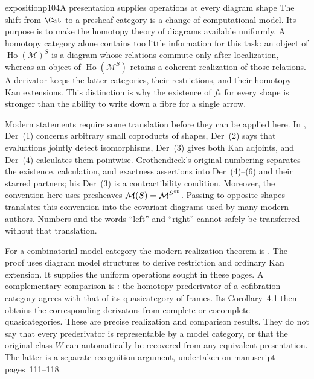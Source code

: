 \begin{dcomment}{exposition}{p104}{A presentation supplies operations at every diagram shape}
The shift from $\Cat$ to a presheaf category is a change of computational model. Its purpose is to make the homotopy theory of diagrams available uniformly. A homotopy category alone contains too little information for this task: an object of $\operatorname{Ho}(\mathcal M)^S$ is a diagram whose relations commute only after localization, whereas an object of $\operatorname{Ho}(\mathcal M^S)$ retains a coherent realization of those relations. A derivator keeps the latter categories, their restrictions, and their homotopy Kan extensions. This distinction is why the existence of $f_*$ for every shape is stronger than the ability to write down a fibre for a single arrow.

Modern statements require some translation before they can be applied here. In \citet[Definition~1.5]{Groth2013}, Der~(1) concerns arbitrary small coproducts of shapes, Der~(2) says that evaluations jointly detect isomorphisms, Der~(3) gives both Kan adjoints, and Der~(4) calculates them pointwise. Grothendieck's original numbering separates the existence, calculation, and exactness assertions into Der~(4)--(6) and their starred partners; his Der~(3) is a contractibility condition. Moreover, the convention here uses presheaves $\mathcal M(S)=\mathcal M^{S^{\rm op}}$. Passing to opposite shapes translates this convention into the covariant diagrams used by many modern authors. Numbers and the words ``left'' and ``right'' cannot safely be transferred without that translation.

For a combinatorial model category the modern realization theorem is \citet[Proposition~1.30]{Groth2013}. The proof uses diagram model structures to derive restriction and ordinary Kan extension. It supplies the uniform operations sought in these pages. A complementary comparison is \citet[Theorem~3.33]{Lenz2018}: the homotopy prederivator of a cofibration category agrees with that of its quasicategory of frames. Its Corollary~4.1 then obtains the corresponding derivators from complete or cocomplete quasicategories. These are precise realization and comparison results. They do not say that every prederivator is representable by a model category, or that the original class $W$ can automatically be recovered from any equivalent presentation. The latter is a separate recognition argument, undertaken on manuscript pages~111--118.
\end{dcomment}

